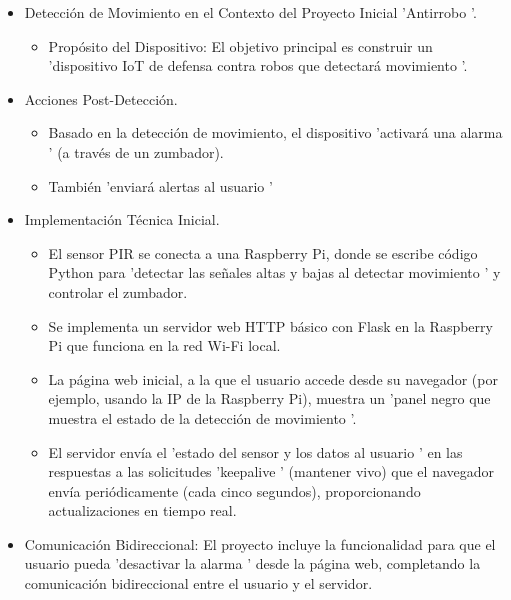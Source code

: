 \documentclass{report}
\begin{document}
\begin{itemize}
    \item Detección de Movimiento en el Contexto del Proyecto Inicial  'Antirrobo '.
    \begin{itemize}
        \item Propósito del Dispositivo: El objetivo principal es construir un  'dispositivo IoT de defensa contra robos que detectará movimiento '.
    \end{itemize}

    \item Acciones Post-Detección.
    \begin{itemize}
        \item Basado en la detección de movimiento, el dispositivo  'activará una alarma ' (a través de un zumbador).
        \item También  'enviará alertas al usuario '
    \end{itemize}

    \item Implementación Técnica Inicial.
    \begin{itemize}
        \item El sensor PIR se conecta a una Raspberry Pi, donde se escribe código Python para  'detectar las señales altas y bajas al detectar movimiento ' 
        y controlar el zumbador.
        \item Se implementa un servidor web HTTP básico con Flask en la Raspberry Pi que funciona en la red Wi-Fi local.
        \item La página web inicial, a la que el usuario accede desde su navegador (por ejemplo, usando la IP de la Raspberry Pi), muestra un  'panel negro 
        que muestra el estado de la detección de movimiento '.
        \item El servidor envía el  'estado del sensor y los datos al usuario ' en las respuestas a las solicitudes  'keepalive ' (mantener vivo) que el 
        navegador envía periódicamente (cada cinco segundos), proporcionando actualizaciones en tiempo real.
    \end{itemize}

    \item Comunicación Bidireccional: El proyecto incluye la funcionalidad para que el usuario pueda  'desactivar la alarma ' desde la página web, completando 
    la comunicación bidireccional entre el usuario y el servidor.
\end{itemize}
\end{document}

